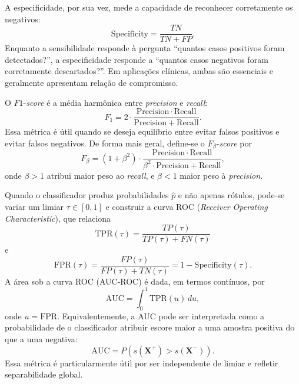 \documentclass[tcc,capa]{texufpel}
\begin{document}
A especificidade, por sua vez, mede a capacidade de reconhecer corretamente os negativos:
\begin{equation}
\mathrm{Specificity} = \frac{TN}{TN + FP}.
\end{equation}
Enquanto a sensibilidade responde à pergunta “quantos casos positivos foram detectados?”, a especificidade responde a “quantos casos negativos foram corretamente descartados?”. Em aplicações clínicas, ambas são essenciais e geralmente apresentam relação de compromisso.

O $F1$-\textit{score} é a média harmônica entre \textit{precision} e \textit{recall}:
\begin{equation}
F_1 = 2 \cdot \frac{\mathrm{Precision}\cdot \mathrm{Recall}}
{\mathrm{Precision} + \mathrm{Recall}}.
\end{equation}
Essa métrica é útil quando se deseja equilíbrio entre evitar falsos positivos e evitar falsos negativos. De forma mais geral, define-se o $F_{\beta}$-\textit{score} por
\begin{equation}
F_{\beta}
=
(1+\beta^2)\cdot
\frac{\mathrm{Precision}\cdot \mathrm{Recall}}
{\beta^2 \cdot \mathrm{Precision} + \mathrm{Recall}},
\end{equation}
onde $\beta>1$ atribui maior peso ao \textit{recall}, e $\beta<1$ maior peso à \textit{precision}.

Quando o classificador produz probabilidades $\hat{p}$ e não apenas rótulos, pode-se variar um limiar $\tau \in [0,1]$ e construir a curva ROC (\textit{Receiver Operating Characteristic}), que relaciona
\begin{equation}
\mathrm{TPR}(\tau) = \frac{TP(\tau)}{TP(\tau)+FN(\tau)}
\end{equation}
e
\begin{equation}
\mathrm{FPR}(\tau) = \frac{FP(\tau)}{FP(\tau)+TN(\tau)} = 1-\mathrm{Specificity}(\tau).
\end{equation}
A área sob a curva ROC (AUC-ROC) é dada, em termos contínuos, por
\begin{equation}
\mathrm{AUC}
=
\int_{0}^{1} \mathrm{TPR}(u)\,du,
\end{equation}
onde $u=\mathrm{FPR}$. Equivalentemente, a AUC pode ser interpretada como a probabilidade de o classificador atribuir escore maior a uma amostra positiva do que a uma negativa:
\begin{equation}
\mathrm{AUC} = P(s(\mathbf{X}^{+}) > s(\mathbf{X}^{-})).
\end{equation}
Essa métrica é particularmente útil por ser independente de limiar e refletir separabilidade global.
\end{document}
